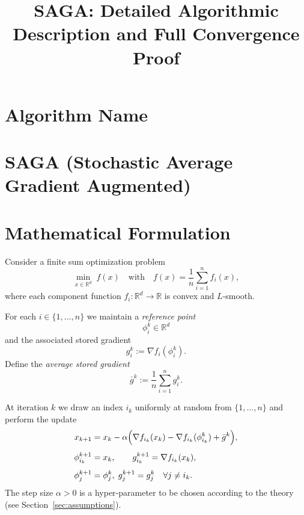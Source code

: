 \documentclass{article}
\begin{document}
\title{SAGA: Detailed Algorithmic Description and Full Convergence Proof}
\author{}
\date{}
\maketitle

\tableofcontents
\newpage

\section*{Algorithm Name}
\section{SAGA (Stochastic Average Gradient Augmented) }

\section{Mathematical Formulation}
Consider a finite sum optimization problem
\[
\min_{x\in\mathbb{R}^d}\;f(x)\quad\text{with}\quad 
f(x)=\frac{1}{n}\sum_{i=1}^{n} f_i(x),
\]
where each component function $f_i:\mathbb{R}^d\rightarrow\mathbb{R}$ is convex and $L$‑smooth.  

For each $i\in\{1,\dots,n\}$ we maintain a \emph{reference point} 
\[
\phi_i^{k}\in\mathbb{R}^d
\]
and the associated stored gradient 
\[
g_i^{k}:=\nabla f_i(\phi_i^{k}).
\]
Define the \emph{average stored gradient}
\[
\bar{g}^{k}:=\frac{1}{n}\sum_{i=1}^{n} g_i^{k}.
\]

At iteration $k$ we draw an index $i_k$ uniformly at random from $\{1,\dots,n\}$ and perform the update
\begin{align}
x_{k+1}
&=x_k-\alpha\Bigl(\nabla f_{i_k}(x_k)-\nabla f_{i_k}(\phi_{i_k}^{k})+\bar{g}^{k}\Bigr),\label{eq:update}\\[1ex]
\phi_{i_k}^{k+1}&=x_k,\qquad 
g_{i_k}^{k+1}= \nabla f_{i_k}(x_k),\label{eq:table-update}\\[1ex]
\phi_{j}^{k+1}&=\phi_{j}^{k},\; g_{j}^{k+1}=g_{j}^{k}\quad\forall j\neq i_k.\label{eq:table-keep}
\end{align}
The step size $\alpha>0$ is a hyper‑parameter to be chosen according to the theory (see Section~\ref{sec:assumptions}).

\end{document}
